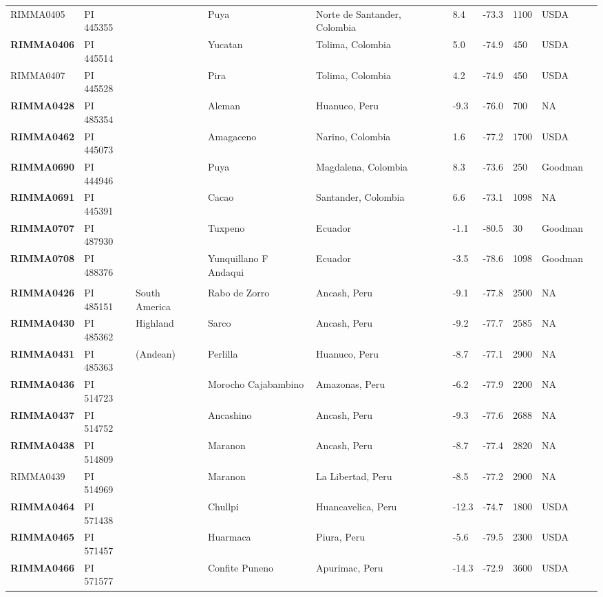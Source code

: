 \begin{table}[h]
\begin{center}
{\begin{tabular}{llllllllll}
RIMMA0405	&	PI 445355	&		&	Puya	&	Norte de Santander, Colombia	&	8.4 	&	-73.3 	&	1100	&	USDA	\\
{\bf RIMMA0406}	&	PI 445514	&		&	Yucatan	&	Tolima, Colombia	&	5.0 	&	-74.9 	&	450	&	USDA	\\
RIMMA0407	&	PI 445528	&		&	Pira	&	Tolima, Colombia	&	4.2 	&	-74.9 	&	450	&	USDA	\\
{\bf RIMMA0428}	&	PI 485354	&		&	Aleman	&	Huanuco, Peru	&	-9.3 	&	-76.0 	&	700	&	NA	\\
{\bf RIMMA0462}	&	PI 445073	&		&	Amagaceno	&	Narino, Colombia	&	1.6 	&	-77.2 	&	1700	&	USDA	\\
{\bf RIMMA0690}	&	PI 444946	&		&	Puya	&	Magdalena, Colombia	&	8.3 	&	-73.6 	&	250	&	Goodman	\\
{\bf RIMMA0691}	&	PI 445391	&		&	Cacao	&	Santander, Colombia	&	6.6 	&	-73.1 	&	1098	&	NA	\\
{\bf RIMMA0707}	&	PI 487930	&		&	Tuxpeno	&	Ecuador	&	-1.1 	&	-80.5 	&	30	&	Goodman	\\
{\bf RIMMA0708}	&	PI 488376	&		&	Yunquillano F Andaqui	&	Ecuador	&	-3.5 	&	-78.6 	&	1098	&	Goodman	\\
	\hline 
	& & & \\[-4mm] 
{\bf RIMMA0426}	&	PI 485151	&	South America	&	Rabo de Zorro	&	Ancash, Peru	&	-9.1 	&	-77.8 	&	2500	&	NA	\\
{\bf RIMMA0430}	&	PI 485362	&	Highland	&	Sarco	&	Ancash, Peru	&	-9.2 	&	-77.7 	&	2585	&	NA	\\
{\bf RIMMA0431}	&	PI 485363	&	(Andean)	&	Perlilla	&	Huanuco, Peru	&	-8.7 	&	-77.1 	&	2900	&	NA	\\
{\bf RIMMA0436}	&	PI 514723	&		&	Morocho Cajabambino	&	Amazonas, Peru	&	-6.2 	&	-77.9 	&	2200	&	NA	\\
{\bf RIMMA0437}	&	PI 514752	&		&	Ancashino	&	Ancash, Peru	&	-9.3 	&	-77.6 	&	2688	&	NA	\\
{\bf RIMMA0438}	&	PI 514809	&		&	Maranon	&	Ancash, Peru	&	-8.7 	&	-77.4 	&	2820	&	NA	\\
RIMMA0439	&	PI 514969	&		&	Maranon	&	La Libertad, Peru	&	-8.5 	&	-77.2 	&	2900	&	NA	\\
{\bf RIMMA0464}	&	PI 571438	&		&	Chullpi	&	Huancavelica, Peru	&	-12.3 	&	-74.7 	&	1800	&	USDA	\\
{\bf RIMMA0465}	&	PI 571457	&		&	Huarmaca	&	Piura, Peru	&	-5.6 	&	-79.5 	&	2300	&	USDA	\\
{\bf RIMMA0466}	&	PI 571577	&		&	Confite Puneno	&	Apurimac, Peru	&	-14.3 	&	-72.9 	&	3600	&	USDA	\\

\end{tabular}}
\end{center}
\end{table}
